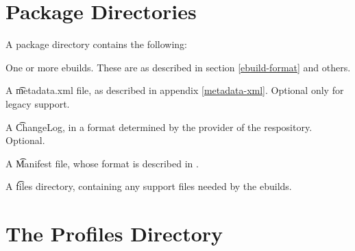 \section{Package Directories}
\label{package-dirs}

A package directory contains the following:
\begin{bulletlist}
\item One or more ebuilds. These are as described in section \ref{ebuild-format} and others.
\item A \t{metadata.xml} file, as described in appendix \ref{metadata-xml}. Optional only for
    legacy support.
\item A \t{ChangeLog}, in a format determined by the provider of the respository. Optional.
\item A \t{Manifest} file, whose format is described in \cite{Glep44}.
\item A \t{files} directory, containing any support files needed by the ebuilds.
\end{bulletlist}

\section{The Profiles Directory}
\label{profiles-dir}

